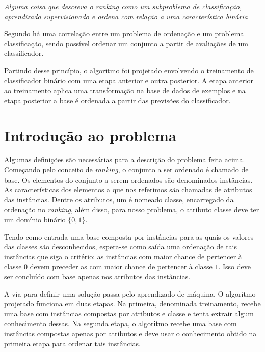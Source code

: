 \emph{Alguma coisa que descreva o ranking como um subproblema de classificação, aprendizado supervisionado e ordena com relação a uma característica binária}

Segundo \cite{langford08} há uma correlação entre um problema de ordenação e um problema classificação, sendo possível ordenar um conjunto a partir de avaliações de um classificador.

Partindo desse princípio, o algoritmo foi projetado envolvendo o treinamento de classificador binário com uma etapa anterior e outra posterior. A etapa anterior ao treinamento aplica uma transformação na base de dados de exemplos e na etapa posterior a base é ordenada a partir das previsões do classificador.


\section{Introdução ao problema}
Algumas definições são necessárias para a descrição do problema feita acima.
Começando pelo conceito de \emph{ranking}, o conjunto a ser ordenado é chamado
de base. Os elementos do conjunto a serem ordenados são denominados instâncias.
As características dos elementos a que nos referimos são chamadas de atributos
das instâncias. Dentre os atributos, um é nomeado classe, encarregado da
ordenação no \emph{ranking}, além disso, para nosso problema, o atributo classe
deve ter um domínio binário $\{0, 1\}$.

Tendo como entrada uma base composta por instâncias para as quais os valores
das classes são desconhecidos, espera-se como saída uma ordenação de tais
instâncias que siga o critério: as instâncias com maior chance de pertencer à
classe $0$ devem preceder as com maior chance de pertencer à classe $1$. Isso
deve ser concluído com base apenas nos atributos das instâncias.

A via para definir uma solução passa pelo aprendizado de máquina. O algoritmo
projetado funciona em duas etapas. Na primeira, denominada treinamento, recebe
uma base com instâncias compostas por atributos e classe e tenta extrair algum
conhecimento dessas. Na segunda etapa, o algoritmo recebe uma base com
instâncias compostas apenas por atributos e deve usar o conhecimento obtido na
primeira etapa para ordenar tais instâncias.

